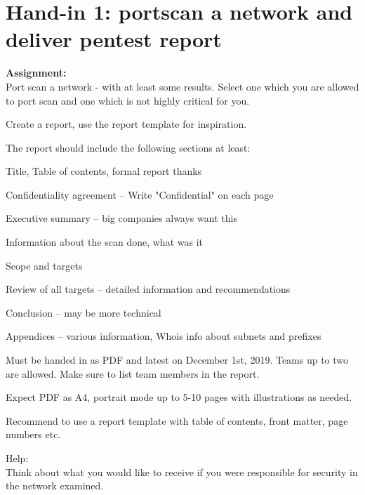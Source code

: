\documentclass[a4paper,11pt,notitlepage]{report}
\begin{document}
\rm
{}

\newcommand{\course}[1]{KEA Kompetence Penetration Testing 2019\\ exercises}




\setcounter{tocdepth}{0}

\normal



\chapter*{Hand-in 1: portscan a network and deliver pentest report}

{\bf Assignment:}\\
Port scan a network - with at least some results. Select one which you are allowed to port scan and one which is not highly critical for you.

Create a report, use the report template for inspiration.

The report should include the following sections at least:
\begin{list2}
\item Title, Table of contents, formal report thanks
\item Confidentiality agreement -- Write "Confidential" on each page
\item Executive summary -- big companies always want this
\item Information about the scan done, what was it
\item Scope and targets
\item Review of all targets -- detailed information and recommendations
\item Conclusion -- may be more technical
\item Appendices -- various information, Whois info about subnets and prefixes
\end{list2}

Must be handed in as PDF and latest on December 1st, 2019. Teams up to two are allowed. Make sure to list team members in the report.

Expect PDF as A4, portrait mode up to 5-10 pages with illustrations as needed.

Recommend to use a report template with table of contents, front matter, page numbers etc.


Help:\\
Think about what you would like to receive if you were responsible for security in the network examined.
\end{document}
